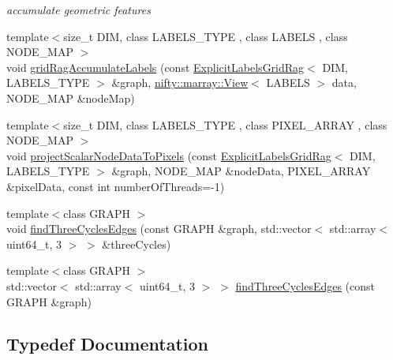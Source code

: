 \begin{DoxyCompactItemize}
\begin{DoxyCompactList}\small\item\em accumulate geometric features \end{DoxyCompactList}\item 
{\footnotesize template$<$size\+\_\+t D\+IM, class L\+A\+B\+E\+L\+S\+\_\+\+T\+Y\+PE , class L\+A\+B\+E\+LS , class N\+O\+D\+E\+\_\+\+M\+AP $>$ }\\void \hyperlink{namespacenifty_1_1graph_a079406a55f43b7ea55616943a3bc6fff}{grid\+Rag\+Accumulate\+Labels} (const \hyperlink{namespacenifty_1_1graph_a45cca2dcd061996d13ec8e6bb8afb200}{Explicit\+Labels\+Grid\+Rag}$<$ D\+IM, L\+A\+B\+E\+L\+S\+\_\+\+T\+Y\+PE $>$ \&graph, \hyperlink{classandres_1_1View}{nifty\+::marray\+::\+View}$<$ L\+A\+B\+E\+LS $>$ data, N\+O\+D\+E\+\_\+\+M\+AP \&node\+Map)
\item 
{\footnotesize template$<$size\+\_\+t D\+IM, class L\+A\+B\+E\+L\+S\+\_\+\+T\+Y\+PE , class P\+I\+X\+E\+L\+\_\+\+A\+R\+R\+AY , class N\+O\+D\+E\+\_\+\+M\+AP $>$ }\\void \hyperlink{namespacenifty_1_1graph_a6b3a3f0cacf4a06ba0b45afc3fb9bc08}{project\+Scalar\+Node\+Data\+To\+Pixels} (const \hyperlink{namespacenifty_1_1graph_a45cca2dcd061996d13ec8e6bb8afb200}{Explicit\+Labels\+Grid\+Rag}$<$ D\+IM, L\+A\+B\+E\+L\+S\+\_\+\+T\+Y\+PE $>$ \&graph, N\+O\+D\+E\+\_\+\+M\+AP \&node\+Data, P\+I\+X\+E\+L\+\_\+\+A\+R\+R\+AY \&pixel\+Data, const int number\+Of\+Threads=-\/1)
\item 
{\footnotesize template$<$class G\+R\+A\+PH $>$ }\\void \hyperlink{namespacenifty_1_1graph_a2ae7ba3bc963090781fd1cafd70ac800}{find\+Three\+Cycles\+Edges} (const G\+R\+A\+PH \&graph, std\+::vector$<$ std\+::array$<$ uint64\+\_\+t, 3 $>$ $>$ \&three\+Cycles)
\item 
{\footnotesize template$<$class G\+R\+A\+PH $>$ }\\std\+::vector$<$ std\+::array$<$ uint64\+\_\+t, 3 $>$ $>$ \hyperlink{namespacenifty_1_1graph_ad3135898f4d621d7b498e65c7b5f38c1}{find\+Three\+Cycles\+Edges} (const G\+R\+A\+PH \&graph)
\end{DoxyCompactItemize}


\subsection{Typedef Documentation}
\mbox{\label{namespacenifty_1_1graph_a5cdea7eb940a178738d5f7ba11b92a15}} 
